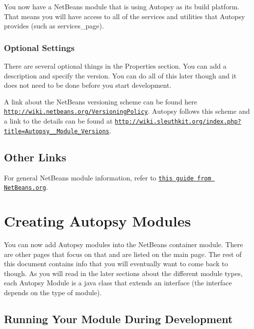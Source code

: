 You now have a Net\+Beans module that is using Autopsy as its build platform. That means you will have access to all of the services and utilities that Autopsy provides (such as services\+\_\+page).\hypertarget{mod_dev_page_mod_dev_mod_config_other}{}\subsubsection{Optional Settings}\label{mod_dev_page_mod_dev_mod_config_other}
There are several optional things in the Properties section. You can add a description and specify the version. You can do all of this later though and it does not need to be done before you start development.

A link about the Net\+Beans versioning scheme can be found here \href{http://wiki.netbeans.org/VersioningPolicy}{\tt http\+://wiki.\+netbeans.\+org/\+Versioning\+Policy}. Autopsy follows this scheme and a link to the details can be found at \href{http://wiki.sleuthkit.org/index.php?title=Autopsy_3_Module_Versions}{\tt http\+://wiki.\+sleuthkit.\+org/index.\+php?title=\+Autopsy\+\_\+\_\+\+Module\+\_\+\+Versions}.\hypertarget{mod_dev_page_mod_dev_mod_other}{}\subsection{Other Links}\label{mod_dev_page_mod_dev_mod_other}
For general Net\+Beans module information, refer to \href{http://bits.netbeans.org/dev/javadoc/org-openide-modules/org/openide/modules/doc-files/api.html}{\tt this guide from Net\+Beans.\+org}.\hypertarget{mod_dev_page_mod_dev_aut}{}\section{Creating Autopsy Modules}\label{mod_dev_page_mod_dev_aut}
You can now add Autopsy modules into the Net\+Beans container module. There are other pages that focus on that and are listed on the main page. The rest of this document contains info that you will eventually want to come back to though. As you will read in the later sections about the different module types, each Autopsy Module is a java class that extends an interface (the interface depends on the type of module).\hypertarget{mod_dev_page_mod_dev_aut_run1}{}\subsection{Running Your Module During Development}\label{mod_dev_page_mod_dev_aut_run1}
